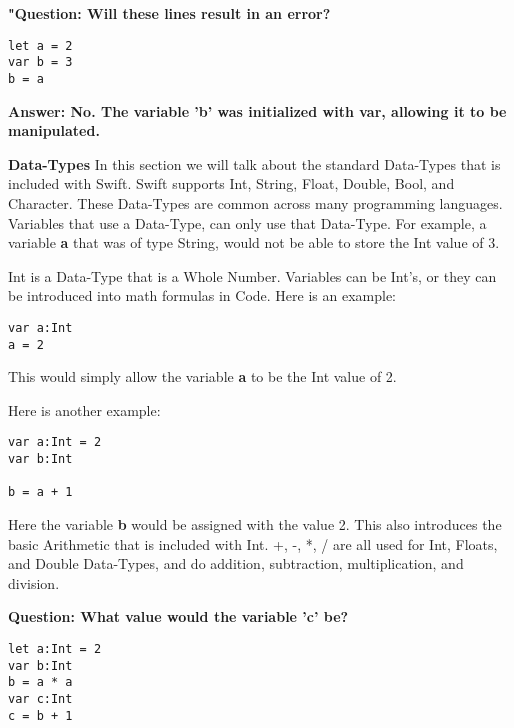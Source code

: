 \documentclass{article}
\theoremstyle{theorem}
\theoremstyle{definition}
\theoremstyle{remark}
\begin{document}
\noindent\newline\newline \textbf{"Question: Will these lines result in an error?}
\begin{verbatim}
let a = 2
var b = 3
b = a
\end{verbatim}

\noindent\newline \textbf{Answer: No. The variable 'b' was initialized with var, allowing it to be manipulated.}


\noindent\newline\newline\newline \textbf{Data-Types}\newline
\noindent In this section we will talk about the standard Data-Types that is included with Swift. Swift supports Int, String, Float, Double, Bool, and Character. These Data-Types are common across many programming languages. Variables that use a Data-Type, can only use that Data-Type. For example, a variable \textbf{a} that was of type String, would not be able to store the Int value of 3.

\noindent\newline\newline Int is a Data-Type that is a Whole Number. Variables can be Int's, or they can be introduced into math formulas in Code. Here is an example:

\begin{verbatim}
var a:Int
a = 2
\end{verbatim}
\noindent\newline This would simply allow the variable \textbf{a} to be the Int value of 2.

\noindent\newline Here is another example:
\begin{verbatim}
var a:Int = 2
var b:Int

b = a + 1

\end{verbatim}
\noindent\newline Here the variable \textbf{b} would be assigned with the value 2. This also introduces the basic Arithmetic that is included with Int. +, -, *, / are all used for Int, Floats, and Double Data-Types, and do addition, subtraction, multiplication, and division.

\noindent\newline\newline \textbf{Question: What value would the variable 'c' be?}
\begin{verbatim}
let a:Int = 2
var b:Int
b = a * a
var c:Int
c = b + 1
\end{verbatim}
\end{document}
